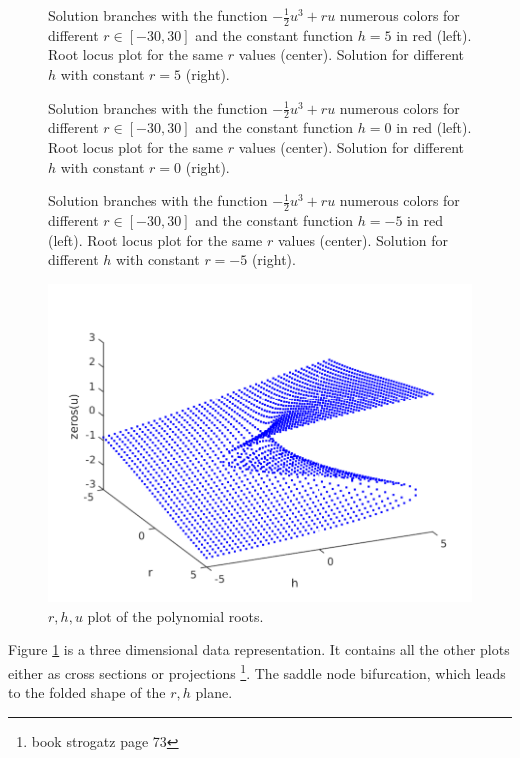 \begin{figure}
\centering



\caption{Solution branches with the function $-\frac{1}{2} u^3 + ru $ numerous colors for different $r\in [-30,30]$ and the constant function $h=5$ in red (left). Root locus plot for the same $r$ values (center). Solution for different $h$ with constant $r = 5$ (right).}
\label{fig:one}



\caption{Solution branches with the function $-\frac{1}{2} u^3 + ru $ numerous colors for different $r\in [-30,30]$ and the constant function $h=0$ in red (left). Root locus plot for the same $r$ values (center). Solution for different $h$ with constant $r = 0$ (right).}
\label{fig:two}



\caption{Solution branches with the function $-\frac{1}{2} u^3 + ru $ numerous colors for different $r\in [-30,30]$ and the constant function $h=-5$ in red (left). Root locus plot for the same $r$ values (center). Solution for different $h$ with constant $r = -5$ (right).}
\label{fig:tree}
\includegraphics[scale = 0.5]{./plots/zerosrhu.pdf}
\caption{$r,h,u$ plot of the polynomial roots.}
\label{fig:3d}
\end{figure}
Figure \ref{fig:3d} is a three dimensional data representation. It contains all the other plots either as cross sections or projections \footnote{book strogatz page 73}. The saddle node bifurcation, which leads to the folded shape of the $r,h$ plane. 

